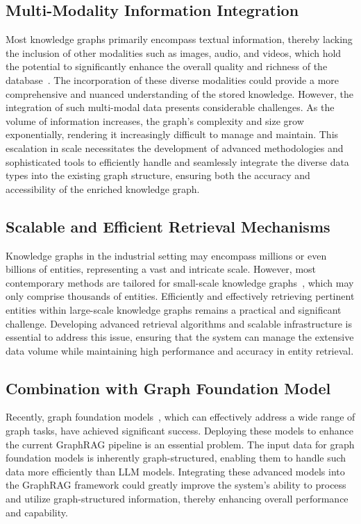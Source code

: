 \documentclass[acmsmall]{acmart}
\begin{document}
\subsection{Multi-Modality Information Integration}
Most knowledge graphs primarily encompass textual information, thereby lacking the inclusion of other modalities such as images, audio, and videos, which hold the potential to significantly enhance the overall quality and richness of the database~\cite{ref:mmgcn}. The incorporation of these diverse modalities could provide a more comprehensive and nuanced understanding of the stored knowledge. However, the integration of such multi-modal data presents considerable challenges. As the volume of information increases, the graph's complexity and size grow exponentially, rendering it increasingly difficult to manage and maintain. This escalation in scale necessitates the development of advanced methodologies and sophisticated tools to efficiently handle and seamlessly integrate the diverse data types into the existing graph structure, ensuring both the accuracy and accessibility of the enriched knowledge graph.

\subsection{Scalable and Efficient Retrieval Mechanisms}
Knowledge graphs in the industrial setting may encompass millions or even billions of entities, representing a vast and intricate scale. However, most contemporary methods are tailored for small-scale knowledge graphs~\cite{ref:graphrag}, which may only comprise thousands of entities. Efficiently and effectively retrieving pertinent entities within large-scale knowledge graphs remains a practical and significant challenge. Developing advanced retrieval algorithms and scalable infrastructure is essential to address this issue, ensuring that the system can manage the extensive data volume while maintaining high performance and accuracy in entity retrieval.

\subsection{Combination with Graph Foundation Model}
Recently, graph foundation models~\cite{ref:ultra,ref:gfm}, which can effectively address a wide range of graph tasks, have achieved significant success. Deploying these models to enhance the current GraphRAG pipeline is an essential problem. The input data for graph foundation models is inherently graph-structured, enabling them to handle such data more efficiently than LLM models. Integrating these advanced models into the GraphRAG framework could greatly improve the system's ability to process and utilize graph-structured information, thereby enhancing overall performance and capability.
\end{document}
